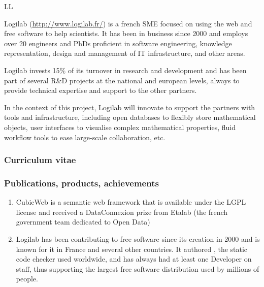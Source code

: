 \begin{sitedescription}{LL}

Logilab (\url{http://www.logilab.fr/}) is a french SME focused on using the web and free software to help
scientists. It has been in business since 2000 and employs over 20 engineers and
PhDs proficient in software engineering, knowledge representation, design and
management of IT infrastructure, and other areas.

Logilab invests 15\% of its turnover in research and development and has been
part of several R\&D projects at the national and european levels, always to
provide technical expertise and support to the other partners.

In the context of this project, Logilab will innovate to support the partners
with tools and infrastructure, including open databases to flexibly store
mathematical objects, user interfaces to visualise complex mathematical
properties, fluid workflow tools to ease large-scale collaboration, etc.



\subsubsection*{Curriculum vitae}








\subsubsection*{Publications, products, achievements}

\begin{enumerate}
 \item CubicWeb is a semantic web framework that is available under the LGPL
   license and received a DataConnexion prize from Etalab (the french government
   team dedicated to Open Data)

\item Logilab has been contributing to free software since its creation in 2000
  and is known for it in France and several other countries. It authored ,
  the static \Python code checker used worldwide, and has always had at least one
   Developer on staff, thus supporting the largest free software
  distribution used by millions of people.


\end{enumerate}
\end{sitedescription}
